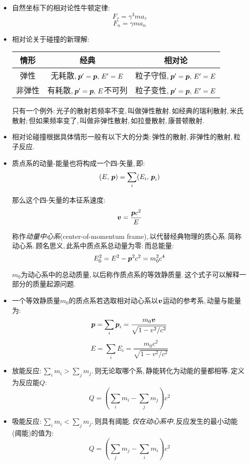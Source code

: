 \begin{itemize}
\item 自然坐标下的相对论性牛顿定律:
\[F_\tau=\gamma^3 ma_\tau\]
\[F_n=\gamma ma_n\]

\item 相对论关于碰撞的新理解:

\begin{table}[H]
\centering
\begin{tabular}{c|c|c}
\hline
情形 &经典 & 相对论\\\hline
弹性 & 无耗散,\,$\boldsymbol{p}'=\boldsymbol{p},\,E'=E$ &粒子守恒,\,$\boldsymbol{p}'=\boldsymbol{p},\,E'=E$\\\hline
非弹性 & 有耗散,\,$\boldsymbol{p}'=\boldsymbol{p},\,E$不可列 &粒子变性,\,$\boldsymbol{p}'=\boldsymbol{p},\,E'=E$\\\hline
\end{tabular}
\end{table}

只有一个例外:\,光子的散射若频率不变,\,叫做弹性散射.\,如经典的瑞利散射,\,米氏散射;\,但如果频率变了,\,叫做非弹性散射,\,如拉曼散射,\,康普顿散射.

\item 相对论碰撞根据具体情形一般有以下大的分类:\,弹性的散射,\,非弹性的散射,\,粒子反应.

\item 质点系的动量-能量也将构成一个四-矢量,\,即:
\[(E,\,\boldsymbol{p})=\sum_i (E_i,\,\boldsymbol{p}_i)\]

那么这个四-矢量的本征系速度:
\[\boldsymbol{v}=\frac{\boldsymbol{p}c^2}{E}\]

称作\emph{动量中心系}(center-of-momentum frame),\,以代替经典物理的质心系.\,简称动心系.\,顾名思义,\,此系中质点系总动量为零:\,而总能量:
\[E_0^2=E^2-\boldsymbol{p}^2c^2=m_0^2 c^4\]

$m_0$为动心系中的总动质量,\,以后称作质点系的等效静质量.\,这个式子可以解释一部分的质量起源问题.

\item 一个等效静质量$m_0$的质点系若选取相对动心系以$\boldsymbol{v}$运动的参考系,\,动量与能量为:
\[\boldsymbol{p}=\sum_i \boldsymbol{p}_i =\frac{m_0\boldsymbol{v}}{\sqrt{1-v^2/c^2}}\]
\[E=\sum_i E_i=\frac{m_0 c^2}{\sqrt{1-v^2/c^2}}\]

\item 放能反应:\,$\sum_i m_i>\sum_j m_j$.\,则无论取哪个系,\,静能转化为动能的量都相等.\,定义为反应能$Q$:
\[Q=\left(\sum_i m_i-\sum_j m_j\right)c^2\]

\item 吸能反应:\,$\sum_i m_i<\sum_j m_j$.\,则具有阈能.\,\emph{仅在动心系中},\,反应发生的最小动能(阈能)的值为:
\[Q=\left(\sum_j m_j-\sum_i m_i\right)c^2\]

\end{itemize}
	

